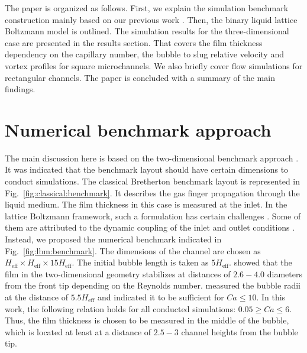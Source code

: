 \documentclass[preprint,12pt]{elsarticle}
\begin{document}
The paper is organized as follows.  First, we explain the simulation benchmark construction
mainly based on our previous work \cite{kuzmin-binary2d}. Then, the binary liquid lattice
Boltzmann model is outlined. The simulation results for the three-dimensional case are presented in
the results section. That covers the film thickness dependency on the capillary number, the bubble
to slug relative velocity and vortex profiles for square microchannels. We also briefly cover flow
simulations for rectangular channels. The paper
is concluded with a summary of the main findings.

\section{Numerical benchmark approach}
\label{sec:numerical:benchmark}
The main discussion here is based on the two-dimensional benchmark approach
\cite{kuzmin-binary2d}. It was indicated that the benchmark layout should have certain
dimensions to conduct simulations. The classical Bretherton benchmark layout is represented in
Fig.~\ref{fig:classical:benchmark}. It describes the gas finger propagation through the liquid
medium.
The film thickness in this case is measured at the inlet. In the lattice Boltzmann framework, such a
formulation has certain challenges \cite{kuzmin-binary2d}. Some of them are attributed to the
dynamic coupling of the inlet and outlet conditions \cite{giavedoni-numerical}. Instead, we
proposed the numerical benchmark indicated in Fig.~\ref{fig:lbm:benchmark}. The dimensions of the
channel are chosen as $H_{\mathrm{eff}}\times H_{\mathrm{eff}} \times 15 H_{\mathrm{eff}}$. The
initial bubble length is taken as $5 H_{\mathrm{eff}}$. \citet{giavedoni-numerical} showed that
the film in the two-dimensional geometry stabilizes at distances of $2.6-4.0$ diameters
from the front tip depending on the Reynolds number. \citet{heil-threedim} measured the bubble radii
at the distance of $5.5 H_{\mathrm{eff}}$ and indicated it to be sufficient for $Ca\leq 10$. In
this work, the following relation holds for all conducted simulations: $0.05 \geq Ca \leq 6$.
Thus, the
film thickness is chosen to be measured in the
middle of the bubble, which is located at least at a distance of $2.5-3$ channel heights from the 
bubble tip.%
\end{document}
